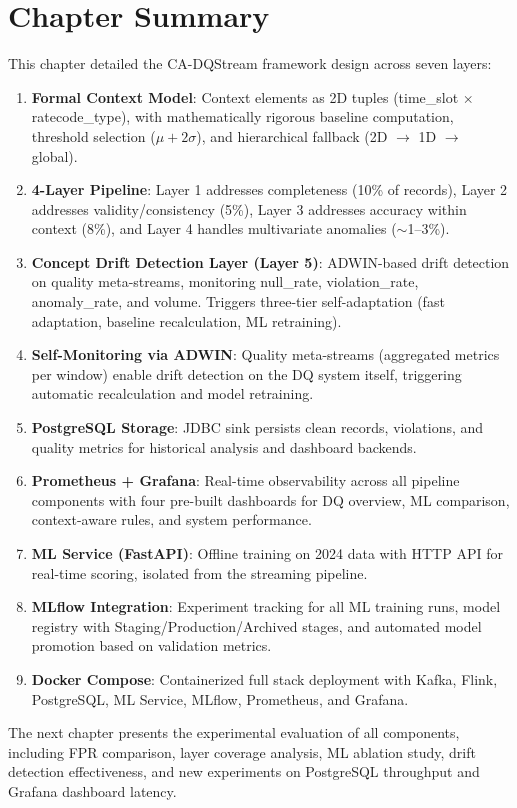 \section{Chapter Summary}

This chapter detailed the CA-DQStream framework design across seven layers:

\begin{enumerate}
    \item \textbf{Formal Context Model}: Context elements as 2D tuples (time\_slot $\times$ ratecode\_type), with mathematically rigorous baseline computation, threshold selection ($\mu + 2\sigma$), and hierarchical fallback (2D $\to$ 1D $\to$ global).
    \item \textbf{4-Layer Pipeline}: Layer 1 addresses completeness (10\% of records), Layer 2 addresses validity/consistency (5\%), Layer 3 addresses accuracy within context (8\%), and Layer 4 handles multivariate anomalies ($\sim$1--3\%).
    \item \textbf{Concept Drift Detection Layer (Layer 5)}: ADWIN-based drift detection on quality meta-streams, monitoring null\_rate, violation\_rate, anomaly\_rate, and volume. Triggers three-tier self-adaptation (fast adaptation, baseline recalculation, ML retraining).
    \item \textbf{Self-Monitoring via ADWIN}: Quality meta-streams (aggregated metrics per window) enable drift detection on the DQ system itself, triggering automatic recalculation and model retraining.
    \item \textbf{PostgreSQL Storage}: JDBC sink persists clean records, violations, and quality metrics for historical analysis and dashboard backends.
    \item \textbf{Prometheus + Grafana}: Real-time observability across all pipeline components with four pre-built dashboards for DQ overview, ML comparison, context-aware rules, and system performance.
    \item \textbf{ML Service (FastAPI)}: Offline training on 2024 data with HTTP API for real-time scoring, isolated from the streaming pipeline.
    \item \textbf{MLflow Integration}: Experiment tracking for all ML training runs, model registry with Staging/Production/Archived stages, and automated model promotion based on validation metrics.
    \item \textbf{Docker Compose}: Containerized full stack deployment with Kafka, Flink, PostgreSQL, ML Service, MLflow, Prometheus, and Grafana.
\end{enumerate}

The next chapter presents the experimental evaluation of all components, including FPR comparison, layer coverage analysis, ML ablation study, drift detection effectiveness, and new experiments on PostgreSQL throughput and Grafana dashboard latency.
